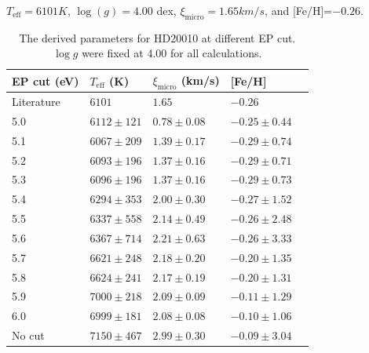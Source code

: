 \documentclass{aa}
\begin{document}
$T_\mathrm{eff} = 6101\si{K}$, $\log(g) = 4.00$ dex,
$\xi_\mathrm{micro} = 1.65\si{km/s}$, and [Fe/H]=$-0.26$.
\begin{table}[htb!]
    \caption{The derived parameters for HD20010 at different EP cut. $\log g$
        were fixed at 4.00 for all calculations.}
    \label{tab:hd20010}
    \centering
    \begin{tabular}{lllll}
      \hline\hline
        EP cut (eV) & $T_\mathrm{eff}$ (K) & $\xi_\mathrm{micro}$ (km/s) & [Fe/H]                \\
      \hline
        Literature  & $6101        $       & $1.65         $             & $-0.26         $      \\
      \hline
        5.0         & $6112 \pm 121$       & $0.78 \pm 0.08$             & $-0.25 \pm 0.44$      \\
        5.1         & $6067 \pm 209$       & $1.39 \pm 0.17$             & $-0.29 \pm 0.74$      \\
        5.2         & $6093 \pm 196$       & $1.37 \pm 0.16$             & $-0.29 \pm 0.71$      \\
        5.3         & $6096 \pm 196$       & $1.37 \pm 0.16$             & $-0.29 \pm 0.73$      \\
        5.4         & $6294 \pm 353$       & $2.00 \pm 0.30$             & $-0.27 \pm 1.52$      \\
        5.5         & $6337 \pm 558$       & $2.14 \pm 0.49$             & $-0.26 \pm 2.48$      \\
        5.6         & $6367 \pm 714$       & $2.21 \pm 0.63$             & $-0.26 \pm 3.33$      \\
        5.7         & $6621 \pm 248$       & $2.18 \pm 0.20$             & $-0.20 \pm 1.35$      \\
        5.8         & $6624 \pm 241$       & $2.17 \pm 0.19$             & $-0.20 \pm 1.31$      \\
        5.9         & $7000 \pm 218$       & $2.09 \pm 0.09$             & $-0.11 \pm 1.29$      \\
        6.0         & $6999 \pm 181$       & $2.08 \pm 0.08$             & $-0.10 \pm 1.06$      \\
        No cut      & $7150 \pm 467$       & $2.99 \pm 0.30$             & $-0.09 \pm 3.04$      \\
      \hline
    \end{tabular}
\end{table}
\end{document}
